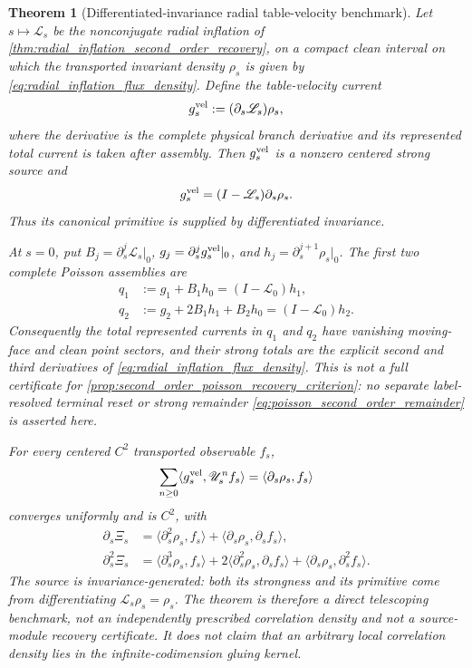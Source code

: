 \documentclass[11pt]{amsart}
\theoremstyle{compactplain}
\newtheorem{theorem}{Theorem}[section]
\theoremstyle{compactdefinition}
\theoremstyle{compactremark}
\newcommand{\Ltransfer}{\mathscr L}
\begin{document}
\begin{theorem}[Differentiated-invariance radial table-velocity benchmark]
\label{thm:radial_table_velocity_benchmark}
Let \(s\mapsto\Ltransfer_s\) be the nonconjugate radial inflation of
\cref{thm:radial_inflation_second_order_recovery}, on a compact clean interval
on which the transported invariant density \(\rho_s\) is given by
\eqref{eq:radial_inflation_flux_density}.  Define the table-velocity current
\begin{equation}
\label{eq:radial_table_velocity_source}
 g_s^{\rm vel}:=(\partial_s\Ltransfer_s)\rho_s,
\end{equation}
where the derivative is the complete physical branch derivative and its
represented total current is taken after assembly.  Then \(g_s^{\rm vel}\) is
a nonzero centered strong source and
\begin{equation}
\label{eq:radial_velocity_invariance_primitive}
 g_s^{\rm vel}=(I-\Ltransfer_s)\partial_s\rho_s.
\end{equation}
Thus its canonical primitive is supplied by differentiated invariance.

At \(s=0\), put \(B_j=\partial_s^j\Ltransfer_s|_0\),
\(g_j=\partial_s^jg_s^{\rm vel}|_0\), and
\(h_j=\partial_s^{j+1}\rho_s|_0\).  The first two complete Poisson assemblies
are
\begin{align}
 q_1&:=g_1+B_1h_0=(I-\Ltransfer_0)h_1,
 \label{eq:radial_velocity_q1}\\
 q_2&:=g_2+2B_1h_1+B_2h_0=(I-\Ltransfer_0)h_2.
 \label{eq:radial_velocity_q2}
\end{align}
Consequently the \emph{total represented currents} in \(q_1\) and \(q_2\)
have vanishing moving-face and clean point sectors, and their strong totals
are the explicit second and third derivatives of
\eqref{eq:radial_inflation_flux_density}.  This is not a full certificate for
\cref{prop:second_order_poisson_recovery_criterion}: no separate
label-resolved terminal reset or strong remainder
\eqref{eq:poisson_second_order_remainder} is asserted here.

For every centered \(C^2\) transported observable \(f_s\),
\begin{equation}
\label{eq:radial_velocity_susceptibility}
 \sum_{n\ge0}
 \langle g_s^{\rm vel},\mathscr U_s^nf_s\rangle
 =
 \langle\partial_s\rho_s,f_s\rangle
\end{equation}
converges uniformly and is \(C^2\), with
\begin{align*}
 \partial_s\Xi_s
 &=\langle\partial_s^2\rho_s,f_s\rangle
   +\langle\partial_s\rho_s,\partial_sf_s\rangle,\\
 \partial_s^2\Xi_s
 &=\langle\partial_s^3\rho_s,f_s\rangle
   +2\langle\partial_s^2\rho_s,\partial_sf_s\rangle
   +\langle\partial_s\rho_s,\partial_s^2f_s\rangle .
\end{align*}
The source is invariance-generated: both its strongness and its primitive come
from differentiating \(\Ltransfer_s\rho_s=\rho_s\).  The theorem is therefore
a direct telescoping benchmark, not an independently prescribed correlation
density and not a source-module recovery certificate.  It does not claim that
an arbitrary local correlation density lies in the infinite-codimension
gluing kernel.
\end{theorem}
\end{document}

